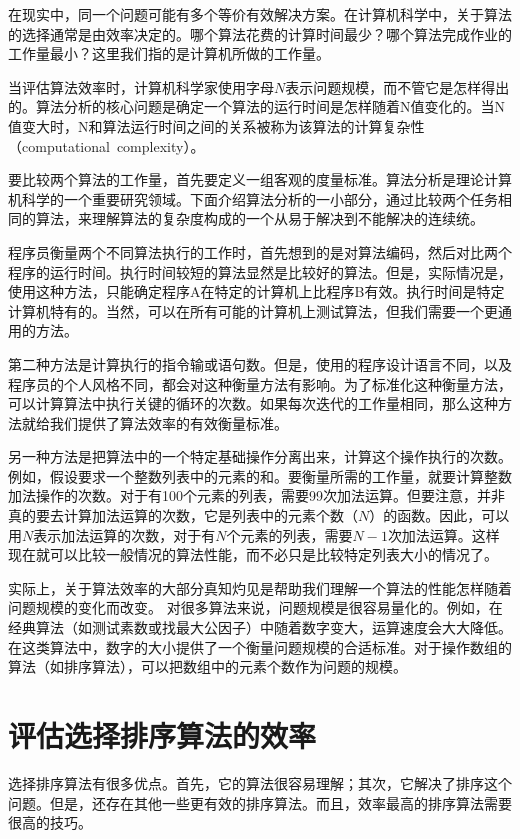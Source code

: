 在现实中，同一个问题可能有多个等价有效解决方案。在计算机科学中，关于算法的选择通常是由效率决定的。哪个算法花费的计算时间最少？哪个算法完成作业的工作量最小？这里我们指的是计算机所做的工作量。

当评估算法效率时，计算机科学家使用字母$N$表示问题规模，而不管它是怎样得出的。算法分析的核心问题是确定一个算法的运行时间是怎样随着N值变化的。当N值变大时，N和算法运行时间之间的关系被称为该算法的计算复杂性（computational~complexity）。


要比较两个算法的工作量，首先要定义一组客观的度量标准。算法分析是理论计算机科学的一个重要研究领域。下面介绍算法分析的一小部分，通过比较两个任务相同的算法，来理解算法的复杂度构成的一个从易于解决到不能解决的连续统。

程序员衡量两个不同算法执行的工作时，首先想到的是对算法编码，然后对比两个程序的运行时间。执行时间较短的算法显然是比较好的算法。但是，实际情况是，使用这种方法，只能确定程序A在特定的计算机上比程序B有效。执行时间是特定计算机特有的。当然，可以在所有可能的计算机上测试算法，但我们需要一个更通用的方法。

第二种方法是计算执行的指令输或语句数。但是，使用的程序设计语言不同，以及程序员的个人风格不同，都会对这种衡量方法有影响。为了标准化这种衡量方法，可以计算算法中执行关键的循环的次数。如果每次迭代的工作量相同，那么这种方法就给我们提供了算法效率的有效衡量标准。

另一种方法是把算法中的一个特定基础操作分离出来，计算这个操作执行的次数。例如，假设要求一个整数列表中的元素的和。要衡量所需的工作量，就要计算整数加法操作的次数。对于有100个元素的列表，需要99次加法运算。但要注意，并非真的要去计算加法运算的次数，它是列表中的元素个数（$N$）的函数。因此，可以用$N$表示加法运算的次数，对于有$N$个元素的列表，需要$N-1$次加法运算。这样现在就可以比较一般情况的算法性能，而不必只是比较特定列表大小的情况了。

实际上，关于算法效率的大部分真知灼见是帮助我们理解一个算法的性能怎样随着问题规模的变化而改变。
对很多算法来说，问题规模是很容易量化的。例如，在经典算法（如测试素数或找最大公因子）中随着数字变大，运算速度会大大降低。在这类算法中，数字的大小提供了一个衡量问题规模的合适标准。对于操作数组的算法（如排序算法），可以把数组中的元素个数作为问题的规模。

\section{评估选择排序算法的效率}

选择排序算法有很多优点。首先，它的算法很容易理解；其次，它解决了排序这个问题。但是，还存在其他一些更有效的排序算法。而且，效率最高的排序算法需要很高的技巧。

